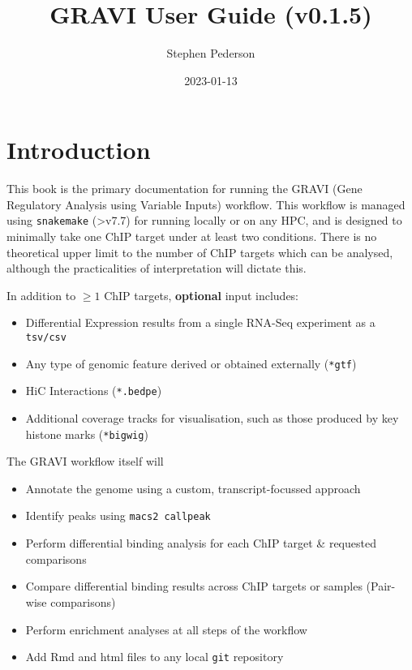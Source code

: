 \documentclass[
]{book}
\title{GRAVI User Guide (v0.1.5)}
\author{Stephen Pederson}
\date{2023-01-13}
\providecommand{\tightlist}{%
  \setlength{\itemsep}{0pt}\setlength{\parskip}{0pt}}
\begin{document}
\maketitle

{
\setcounter{tocdepth}{1}
\tableofcontents
}
\hypertarget{introduction}{%
\chapter{Introduction}\label{introduction}}

This book is the primary documentation for running the GRAVI (Gene Regulatory Analysis using Variable Inputs) workflow.
This workflow is managed using \texttt{snakemake} (\textgreater v7.7) for running locally or on any HPC, and is designed to minimally take one ChIP target under at least two conditions.
There is no theoretical upper limit to the number of ChIP targets which can be analysed, although the practicalities of interpretation will dictate this.

In addition to \(\geq 1\) ChIP targets, \textbf{optional} input includes:

\begin{itemize}
\tightlist
\item
  Differential Expression results from a single RNA-Seq experiment as a \texttt{tsv/csv}
\item
  Any type of genomic feature derived or obtained externally (\texttt{*gtf})
\item
  HiC Interactions (\texttt{*.bedpe})
\item
  Additional coverage tracks for visualisation, such as those produced by key histone marks (\texttt{*bigwig})
\end{itemize}

The GRAVI workflow itself will

\begin{itemize}
\tightlist
\item
  Annotate the genome using a custom, transcript-focussed approach
\item
  Identify peaks using \texttt{macs2\ callpeak}
\item
  Perform differential binding analysis for each ChIP target \& requested comparisons
\item
  Compare differential binding results across ChIP targets or samples (Pair-wise comparisons)
\item
  Perform enrichment analyses at all steps of the workflow
\item
  Add Rmd and html files to any local \texttt{git} repository
\end{itemize}
\end{document}
